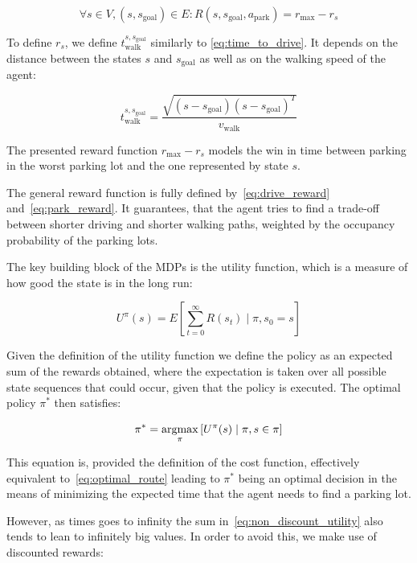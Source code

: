 \begin{equation}
\label{eq:park_reward}
\forall s \in V, (s, s_{\mathrm{goal}}) \in E : R(s, s_{\mathrm{goal}}, a_{\mathrm{park}}) = r_{\max} - r_s
\end{equation}

To define $r_s$, we define $t_{\mathrm{walk}}^{s,s_{\mathrm{goal}}}$ similarly
to \eqref{eq:time_to_drive}. It depends on the distance between the states $s$ and $s_\mathrm{goal}$ as well as on the walking speed of the agent:

\begin{equation}
t_{\mathrm{walk}}^{s,s_{\mathrm{goal}}} = \frac{\sqrt{(s -
s_{\mathrm{goal}}) {(s - s_{\mathrm{goal}})}^T}}{v_{\mathrm{walk}}}
\end{equation}

The presented reward function $r_{\max} - r_s$ models the win in time between
parking in the worst parking lot and the one represented by state $s$.

The general reward function is fully defined by~\eqref{eq:drive_reward}
and~\eqref{eq:park_reward}. It guarantees, that the agent tries to find a
trade-off between shorter driving and shorter walking paths, weighted by the
occupancy probability of the parking lots.

The key building block of the MDPs is  the utility function, which is a
measure of how good the state is in the long run:

\begin{equation}
\label{eq:non_discount_utility}
U^{\pi}(s) = E\left[\sum_{t=0}^{\infty} R(s_t) \mid \pi,s_0 = s \right]
\end{equation}

Given the definition of the utility function we define the policy as an
expected sum of the rewards obtained, where the expectation is taken over all
possible state sequences that could occur, given that the policy is executed.
The optimal policy $\pi^*$ then satisfies:

\begin{equation}
\label{eq:optimal_policy}
\pi^* = \mathop{\rm argmax}_\pi \left[ U^{\pi}(s) \mid \pi, s \in \pi \right]
\end{equation}

This equation is, provided the definition of the cost function, effectively
equivalent to~\eqref{eq:optimal_route} leading to $\pi^*$ being an optimal
decision in the means of minimizing the expected time that the agent needs to
find a parking lot.

However, as times goes to infinity the sum in~\eqref{eq:non_discount_utility}
also tends to lean to infinitely big values. In order to avoid this, we make
use of discounted rewards:

